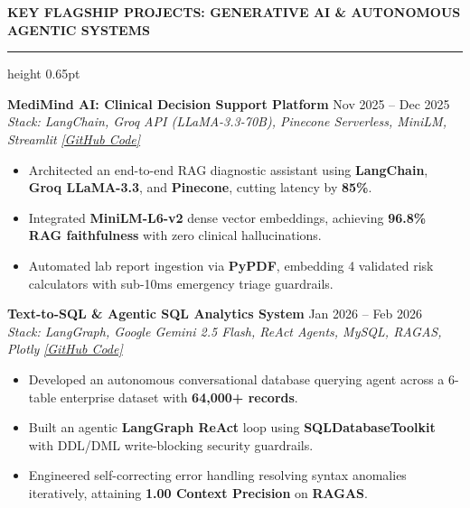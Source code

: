 \documentclass[10pt]{article}
\newcommand{\resumesection}[1]{%
  \vspace{4.5pt}%
  {\large \textbf{\uppercase{#1}}}%
  \vspace{1.5pt}%
  \hrule height 0.65pt%
  \vspace{3pt}%
}
\begin{document}
\resumesection{Key Flagship Projects: Generative AI \& Autonomous Agentic Systems}

\textbf{MediMind AI: Clinical Decision Support Platform} \hfill Nov 2025 -- Dec 2025\\
\textit{Stack: LangChain, Groq API (LLaMA-3.3-70B), Pinecone Serverless, MiniLM, Streamlit} \hfill \href{https://github.com/Ankitiitk369/-MediMind-AI-Generative-AI-RAG-Based-Clinical-Decision-Support-Healthcare-Platform}{\textit{[GitHub Code]}}
\begin{itemize}[noitemsep, topsep=1pt, partopsep=0pt, parsep=0.5pt]
    \item Architected an end-to-end RAG diagnostic assistant using \textbf{LangChain}, \textbf{Groq LLaMA-3.3}, and \textbf{Pinecone}, cutting latency by \textbf{85\%}.
    \item Integrated \textbf{MiniLM-L6-v2} dense vector embeddings, achieving \textbf{96.8\% RAG faithfulness} with zero clinical hallucinations.
    \item Automated lab report ingestion via \textbf{PyPDF}, embedding 4 validated risk calculators with sub-10ms emergency triage guardrails.
\end{itemize}

\vspace{1.5pt}

\textbf{Text-to-SQL \& Agentic SQL Analytics System} \hfill Jan 2026 -- Feb 2026\\
\textit{Stack: LangGraph, Google Gemini 2.5 Flash, ReAct Agents, MySQL, RAGAS, Plotly} \hfill \href{https://github.com/Ankitiitk369/Text-to-SQL-Agentic-SQL-Analytics-System}{\textit{[GitHub Code]}}
\begin{itemize}[noitemsep, topsep=1pt, partopsep=0pt, parsep=0.5pt]
    \item Developed an autonomous conversational database querying agent across a 6-table enterprise dataset with \textbf{64,000+ records}.
    \item Built an agentic \textbf{LangGraph ReAct} loop using \textbf{SQLDatabaseToolkit} with DDL/DML write-blocking security guardrails.
    \item Engineered self-correcting error handling resolving syntax anomalies iteratively, attaining \textbf{1.00 Context Precision} on \textbf{RAGAS}.
\end{itemize}

\vspace{1.5pt}
\end{document}
